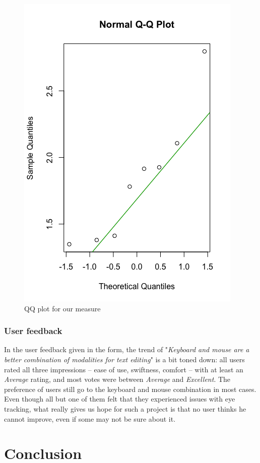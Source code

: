 \documentclass[12pt, a4paper]{article}
\begin{document}
\begin{figure}
\centering
\includegraphics[scale=.3]{qqplot}
\caption{QQ plot for our measure}
\label{qqplot}
\end{figure}

\subsubsection{User feedback} \label{feedback}
In the user feedback given in the form, the trend of "\textit{Keyboard and mouse are a better combination of modalities for text editing}" is a bit toned down: all users rated all three impressions -- ease of use, swiftness, comfort -- with at least an \textit{Average} rating, and most votes were between \textit{Average} and \textit{Excellent}. The preference of users still go to the keyboard and mouse combination in most cases. \\
Even though all but one of them felt that they experienced issues with eye tracking, what really gives us hope for such a project is that no user thinks he cannot improve, even if some may not be sure about it. 

\section{Conclusion}
\end{document}
